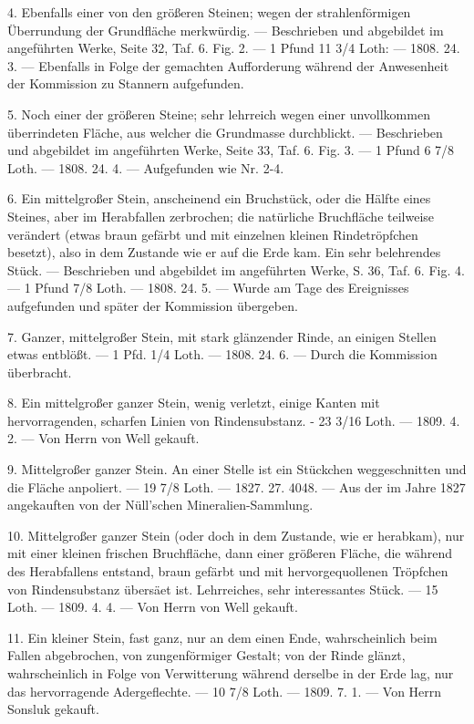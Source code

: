 \documentclass[a4paper, 11pt, oneside, polutonikogreek, german]{article}
\begin{document}
4. Ebenfalls einer von den größeren Steinen; wegen der strahlenförmigen Überrundung der Grundfläche merkwürdig. — Beschrieben und abgebildet im angeführten Werke, Seite 32, Taf. 6. Fig. 2. — 1 Pfund 11 3/4 Loth: — 1808. 24. 3. — Ebenfalls in Folge der gemachten Aufforderung während der Anwesenheit der Kommission zu Stannern aufgefunden.

5. Noch einer der größeren Steine; sehr lehrreich wegen einer unvollkommen überrindeten Fläche, aus welcher die Grundmasse durchblickt. — Beschrieben und abgebildet im angeführten Werke, Seite 33, Taf. 6. Fig. 3. — 1 Pfund 6 7/8 Loth. — 1808. 24. 4. — Aufgefunden wie Nr. 2-4.

6. Ein mittelgroßer Stein, anscheinend ein Bruchstück, oder die Hälfte eines Steines, aber im Herabfallen zerbrochen; die natürliche Bruchfläche teilweise verändert (etwas braun gefärbt und mit einzelnen kleinen Rindetröpfchen besetzt), also in dem Zustande wie er auf die Erde kam. Ein sehr belehrendes Stück. — Beschrieben und abgebildet im angeführten Werke, S. 36, Taf. 6. Fig. 4. — 1 Pfund 7/8 Loth. — 1808. 24. 5. — Wurde am Tage des Ereignisses aufgefunden und später der Kommission übergeben.

7. Ganzer, mittelgroßer Stein, mit stark glänzender Rinde, an einigen Stellen etwas entblößt. — 1 Pfd. 1/4 Loth. — 1808. 24. 6. — Durch die Kommission überbracht.

8. Ein mittelgroßer ganzer Stein, wenig verletzt, einige Kanten mit hervorragenden, scharfen Linien von Rindensubstanz. - 23 3/16 Loth. — 1809. 4. 2. — Von Herrn von Well gekauft.

9. Mittelgroßer ganzer Stein. An einer Stelle ist ein Stückchen weggeschnitten und die Fläche anpoliert. — 19 7/8 Loth. — 1827. 27. 4048. — Aus der im Jahre 1827 angekauften von der Nüll’schen Mineralien-Sammlung.

10. Mittelgroßer ganzer Stein (oder doch in dem Zustande, wie er herabkam), nur mit einer kleinen frischen Bruchfläche, dann einer größeren Fläche, die während des Herabfallens entstand, braun gefärbt und mit hervorgequollenen Tröpfchen von Rindensubstanz übersäet ist. Lehrreiches, sehr interessantes Stück. — 15 Loth. — 1809. 4. 4. — Von Herrn von Well gekauft.

11. Ein kleiner Stein, fast ganz, nur an dem einen Ende, wahrscheinlich beim Fallen abgebrochen, von zungenförmiger Gestalt; von der Rinde glänzt, wahrscheinlich in Folge von Verwitterung während derselbe in der Erde lag, nur das hervorragende Adergeflechte. — 10 7/8 Loth. — 1809. 7. 1. — Von Herrn Sonsluk gekauft.
\end{document}
